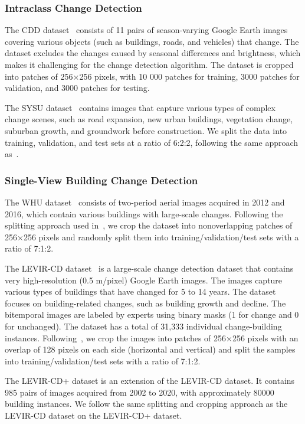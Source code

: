 \documentclass[journal]{IEEEtran}
\begin{document}
\subsubsection{Intraclass Change Detection}

The CDD dataset~\cite{cdd} consists of 11 pairs of season-varying Google Earth images covering various objects (such as buildings, roads, and vehicles) that change. The dataset excludes the changes caused by seasonal differences and brightness, which makes it challenging for the change detection algorithm. The dataset is cropped into patches of 256×256 pixels, with 10 000 patches for training, 3000 patches for validation, and 3000 patches for testing.

The SYSU dataset~\cite{sysu} contains images that capture various types of complex change scenes, such as road expansion, new urban buildings, vegetation change, suburban growth, and groundwork before construction. We split the data into training, validation, and test sets at a ratio of 6:2:2, following the same approach as~\cite{sysu}.

\subsubsection{Single-View Building Change Detection}

The WHU dataset~\cite{whu} consists of two-period aerial images acquired in 2012 and 2016, which contain various buildings with large-scale changes. Following the splitting approach used in~\cite{orsi}, we crop the dataset into nonoverlapping patches of 256×256 pixels and randomly split them into training/validation/test sets with a ratio of 7:1:2.

The LEVIR-CD dataset~\cite{sta} is a large-scale change detection dataset that contains very high-resolution (0.5 m/pixel) Google Earth images. The images capture various types of buildings that have changed for 5 to 14 years. The dataset focuses on building-related changes, such as building growth and decline. The bitemporal images are labeled by experts using binary masks (1 for change and 0 for unchanged). The dataset has a total of 31,333 individual change-building instances. Following~\cite{fccdn}, we crop the images into patches of 256×256 pixels with an overlap of 128 pixels on each side (horizontal and vertical) and split the samples into training/validation/test sets with a ratio of 7:1:2.

The LEVIR-CD+ dataset is an extension of the LEVIR-CD dataset. It contains 985 pairs of images acquired from 2002 to 2020, with approximately 80000 building instances. We follow the same splitting and cropping approach as the LEVIR-CD dataset on the LEVIR-CD+ dataset.
\end{document}
